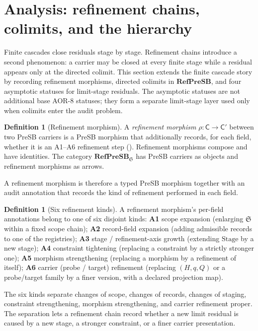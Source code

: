 \documentclass[11pt]{article}
\newcommand{\RefPreSB}{\mathbf{RefPreSB}}
\theoremstyle{definition}
\newtheorem{definition}[theorem]{Definition}
\begin{document}
 \section{Analysis: refinement chains, colimits, and the hierarchy}\label{sec:aor-analysis}

Finite cascades close residuals stage by stage.  Refinement chains
introduce a second phenomenon: a carrier may be closed at every
finite stage while a residual appears only at the directed colimit.
This section extends the finite cascade story by recording refinement
morphisms, directed colimits in \(\RefPreSB\), and four asymptotic
statuses for limit-stage residuals.  The asymptotic statuses are not
additional base AOR-8 statuses; they form a separate limit-stage
layer used only when colimits enter the audit problem.

\begin{definition}[Refinement morphism]\label{def:aor:refinement-morphism}
A \emph{refinement morphism} $\rho:\mathsf C\to\mathsf C'$ between two
PreSB carriers is a PreSB morphism that additionally records, for each
field, whether it is an A1--A6 refinement step
().  Refinement morphisms compose
and have identities.  The category $\RefPreSB_{\mathfrak S}$ has PreSB
carriers as objects and refinement morphisms as arrows.
\end{definition}

A refinement morphism is therefore a typed PreSB morphism together
with an audit annotation that records the kind of refinement
performed in each field.

\begin{definition}[Six refinement kinds]\label{def:aor:refinement-kinds-six}
A refinement morphism's per-field annotations belong to one of six
disjoint kinds:
\textbf{A1} scope expansion (enlarging $\mathfrak S$ within a fixed
scope chain);
\textbf{A2} record-field expansion (adding admissible records to one
of the registries);
\textbf{A3} stage / refinement-axis growth (extending $\mathrm{Stage}$
by a new stage);
\textbf{A4} constraint tightening (replacing a constraint by a
strictly stronger one);
\textbf{A5} morphism strengthening (replacing a morphism by a
refinement of itself);
\textbf{A6} carrier (probe / target) refinement (replacing $(H,q,Q)$
or a probe/target family by a finer version, with a declared
projection map).
\end{definition}

The six kinds separate changes of scope, changes of records, changes
of staging, constraint strengthening, morphism strengthening, and
carrier refinement proper.  The separation lets a refinement chain
record whether a new limit residual is caused by a new stage, a
stronger constraint, or a finer carrier presentation.
\end{document}
